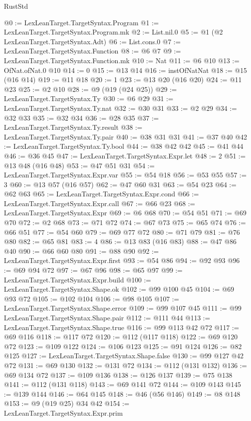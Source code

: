 \begin{lexlean}{RustStd}
\begin{coremodule}
@0 := LexLeanTarget.TargetSyntax.Program
@1 := LexLeanTarget.TargetSyntax.Program.mk
@2 := List.nil.{0}
@5 := @1 (@2 LexLeanTarget.TargetSyntax.Adt)
@6 := List.cons.{0}
@7 := LexLeanTarget.TargetSyntax.Function
@8 := @6 @7
@9 := LexLeanTarget.TargetSyntax.Function.mk
@10 := Nat
@11 := @6 @10
@13 := OfNat.ofNat.{0} @10
@14 := 0
@15 := @13 @14
@16 := instOfNatNat
@18 := @15 (@16 @14)
@19 := @11 @18
@20 := 1
@23 := @13 @20 (@16 @20)
@24 := @11 @23
@25 := @2 @10
@28 := @9 (@19 (@24 @25))
@29 := LexLeanTarget.TargetSyntax.Ty
@30 := @6 @29
@31 := LexLeanTarget.TargetSyntax.Ty.nat
@32 := @30 @31
@33 := @2 @29
@34 := @32 @33
@35 := @32 @34
@36 := @28 @35
@37 := LexLeanTarget.TargetSyntax.Ty.result
@38 := LexLeanTarget.TargetSyntax.Ty.pair
@40 := @38 @31 @31
@41 := @37 @40
@42 := LexLeanTarget.TargetSyntax.Ty.bool
@44 := @38 @42 @42
@45 := @41 @44
@46 := @36 @45
@47 := LexLeanTarget.TargetSyntax.Expr.let
@48 := 2
@51 := @13 @48 (@16 @48)
@53 := @47 @51 @31
@54 := LexLeanTarget.TargetSyntax.Expr.var
@55 := @54 @18
@56 := @53 @55
@57 := 3
@60 := @13 @57 (@16 @57)
@62 := @47 @60 @31
@63 := @54 @23
@64 := @62 @63
@65 := LexLeanTarget.TargetSyntax.Expr.cond
@66 := LexLeanTarget.TargetSyntax.Expr.call
@67 := @66 @23
@68 := LexLeanTarget.TargetSyntax.Expr
@69 := @6 @68
@70 := @54 @51
@71 := @69 @70
@72 := @2 @68
@73 := @71 @72
@74 := @67 @73
@75 := @65 @74
@76 := @66 @51
@77 := @54 @60
@79 := @69 @77 @72
@80 := @71 @79
@81 := @76 @80
@82 := @65 @81
@83 := 4
@86 := @13 @83 (@16 @83)
@88 := @47 @86 @40
@90 := @66 @60 @80
@91 := @88 @90
@92 := LexLeanTarget.TargetSyntax.Expr.first
@93 := @54 @86
@94 := @92 @93
@96 := @69 @94 @72
@97 := @67 @96
@98 := @65 @97
@99 := LexLeanTarget.TargetSyntax.Expr.build
@100 := LexLeanTarget.TargetSyntax.Shape.ok
@102 := @99 @100 @45
@104 := @69 @93 @72
@105 := @102 @104
@106 := @98 @105
@107 := LexLeanTarget.TargetSyntax.Shape.error
@109 := @99 @107 @45
@111 := @99 LexLeanTarget.TargetSyntax.Shape.pair
@112 := @111 @44
@113 := LexLeanTarget.TargetSyntax.Shape.true
@116 := @99 @113 @42 @72
@117 := @69 @116
@118 := @117 @72
@120 := @112 (@117 @118)
@122 := @69 @120 @72
@123 := @109 @122
@124 := @106 @123
@125 := @91 @124
@126 := @82 @125
@127 := LexLeanTarget.TargetSyntax.Shape.false
@130 := @99 @127 @42 @72
@131 := @69 @130
@132 := @131 @72
@134 := @112 (@131 @132)
@136 := @69 @134 @72
@137 := @109 @136
@138 := @126 @137
@139 := @75 @138
@141 := @112 (@131 @118)
@143 := @69 @141 @72
@144 := @109 @143
@145 := @139 @144
@146 := @64 @145
@148 := @46 (@56 @146)
@149 := @8 @148
@153 := @9 (@19 @25) @34 @42
@154 := LexLeanTarget.TargetSyntax.Expr.prim

\end{coremodule}
\end{lexlean}
